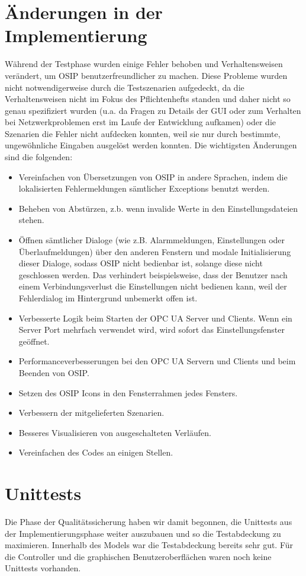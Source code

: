 \documentclass[parskip=full]{scrartcl}
\begin{document}
\section{Änderungen in der Implementierung}
Während der Testphase wurden einige Fehler behoben und Verhaltensweisen verändert, um OSIP benutzerfreundlicher zu machen.
Diese Probleme wurden nicht notwendigerweise durch die Testszenarien aufgedeckt, da die Verhaltensweisen nicht im Fokus des
Pflichtenhefts standen und daher nicht so genau spezifiziert wurden (u.a. da Fragen zu Details der GUI oder zum Verhalten bei Netzwerkproblemen
erst im Laufe der Entwicklung aufkamen) oder die Szenarien die Fehler nicht aufdecken konnten, weil sie nur durch bestimmte,
ungewöhnliche Eingaben ausgelöst werden konnten. Die wichtigsten Änderungen sind die folgenden:

\begin{itemize}
 \item Vereinfachen von Übersetzungen von OSIP in andere Sprachen, indem die lokalisierten Fehlermeldungen sämtlicher Exceptions benutzt werden.
 \item Beheben von Abstürzen, z.b. wenn invalide Werte in den Einstellungsdateien stehen.
 \item Öffnen sämtlicher Dialoge (wie z.B. Alarmmeldungen, Einstellungen oder Überlaufmeldungen) über den anderen Fenstern und modale Initialisierung dieser Dialoge,
 sodass OSIP nicht bedienbar ist, solange diese nicht geschlossen werden. Das verhindert beispielsweise, dass der Benutzer nach einem Verbindungsverlust
 die Einstellungen nicht bedienen kann, weil der Fehlerdialog im Hintergrund unbemerkt offen ist.
 \item Verbesserte Logik beim Starten der OPC UA Server und Clients. Wenn ein Server Port mehrfach verwendet wird, wird sofort das
 Einstellungsfenster geöffnet.
 \item Performanceverbesserungen bei den OPC UA Servern und Clients und beim Beenden von OSIP.
 \item Setzen des OSIP Icons in den Fensterrahmen jedes Fensters.
 \item Verbessern der mitgelieferten Szenarien.
 \item Besseres Visualisieren von ausgeschalteten Verläufen.
 \item Vereinfachen des Codes an einigen Stellen.
\end{itemize}

\section{Unittests}
Die Phase der Qualitätssicherung haben wir damit begonnen, die Unittests aus der Implementierungsphase weiter auszubauen und so die Testabdeckung zu maximieren.
Innerhalb des Models war die Testabdeckung bereits sehr gut. Für die Controller und die graphischen Benutzeroberflächen waren noch keine Unittests vorhanden.
\end{document}
